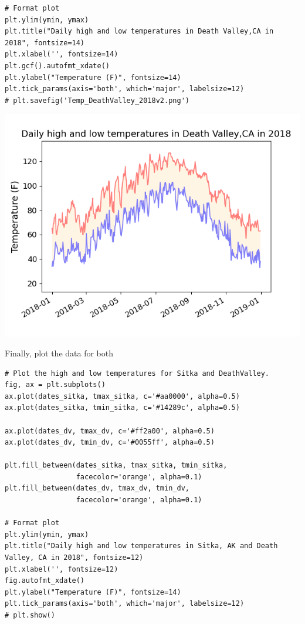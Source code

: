 \documentclass[10pt]{book}
\begin{document}
\begin{enumerate}
\begin{verbatim}
# Format plot
plt.ylim(ymin, ymax)
plt.title("Daily high and low temperatures in Death Valley,CA in 2018", fontsize=14)
plt.xlabel('', fontsize=14)
plt.gcf().autofmt_xdate()
plt.ylabel("Temperature (F)", fontsize=14)
plt.tick_params(axis='both', which='major', labelsize=12)
# plt.savefig('Temp_DeathValley_2018v2.png')
\end{verbatim}

\begin{center}
\includegraphics[width=.9\linewidth]{output/images/Temp_range_DeathValley.png}
\label{orgf3ffb5d}
\end{center}

Finally, plot the data for both
\begin{verbatim}
# Plot the high and low temperatures for Sitka and DeathValley.
fig, ax = plt.subplots()
ax.plot(dates_sitka, tmax_sitka, c='#aa0000', alpha=0.5)
ax.plot(dates_sitka, tmin_sitka, c='#14289c', alpha=0.5)

ax.plot(dates_dv, tmax_dv, c='#ff2a00', alpha=0.5)
ax.plot(dates_dv, tmin_dv, c='#0055ff', alpha=0.5)

plt.fill_between(dates_sitka, tmax_sitka, tmin_sitka,
                 facecolor='orange', alpha=0.1)
plt.fill_between(dates_dv, tmax_dv, tmin_dv,
                 facecolor='orange', alpha=0.1)

# Format plot
plt.ylim(ymin, ymax)
plt.title("Daily high and low temperatures in Sitka, AK and Death Valley, CA in 2018", fontsize=12)
plt.xlabel('', fontsize=12)
fig.autofmt_xdate()
plt.ylabel("Temperature (F)", fontsize=14)
plt.tick_params(axis='both', which='major', labelsize=12)
# plt.show()
\end{verbatim}


\end{enumerate}
\end{document}
